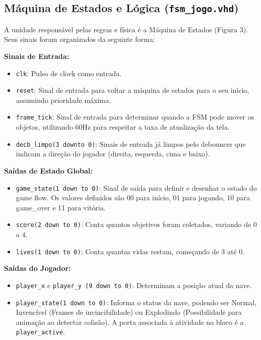 \documentclass[11pt, a4paper]{article}
\begin{document}
\subsection{Máquina de Estados e Lógica (\texttt{fsm\_jogo.vhd})}
A unidade responsável pelas regras e física é a Máquina de Estados (Figura 3). Seus sinais foram organizados da seguinte forma:

\textbf{Sinais de Entrada:}
\begin{itemize}
    \item \texttt{clk}: Pulso de clock como entrada.
    \item \texttt{reset}: Sinal de entrada para voltar a máquina de estados para o seu início, assumindo prioridade máxima.
    \item \texttt{frame\_tick}: Sinal de entrada para determinar quando a FSM pode mover os objetos, utilizando 60Hz para respeitar a taxa de atualização da tela.
    \item \texttt{decb\_limpo(3 downto 0)}: Sinais de entrada já limpos pelo debouncer que indicam a direção do jogador (direita, esquerda, cima e baixo).
\end{itemize}

\textbf{Saídas de Estado Global:}
\begin{itemize}
    \item \texttt{game\_state(1 down to 0)}: Sinal de saída para definir e desenhar o estado do game flow. Os valores definidos são 00 para início, 01 para jogando, 10 para game\_over e 11 para vitória.
    \item \texttt{score(2 down to 0)}: Conta quantos objetivos foram coletados, variando de 0 a 4.
    \item \texttt{lives(1 down to 0)}: Conta quantas vidas restam, começando de 3 até 0.
\end{itemize}

\textbf{Saídas do Jogador:}
\begin{itemize}
    \item \texttt{player\_x} e \texttt{player\_y (9 down to 0)}: Determinam a posição atual da nave.
    \item \texttt{player\_state(1 down to 0)}: Informa o status da nave, podendo ser Normal, Invencível (Frames de invincibilidade) ou Explodindo (Possibilidade para animação ao detectar colisão). A porta associada à atividade no bloco é a \texttt{player\_active}.
\end{itemize}
\end{document}
